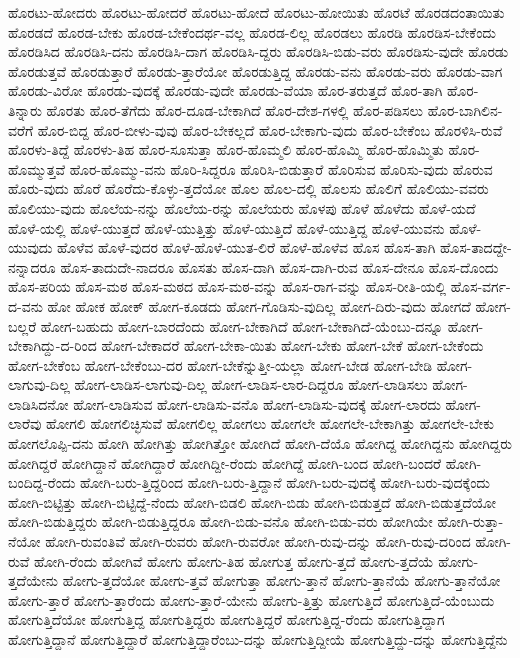 {ಹೊರಟು-ಹೋದರು
ಹೊರಟು-ಹೋದರೆ
ಹೊರಟು-ಹೋದೆ
ಹೊರಟು-ಹೋಯಿತು
ಹೊರಟೆ
ಹೊರಡದಂತಾಯಿತು
ಹೊರಡದೆ
ಹೊರಡ-ಬೇಕು
ಹೊರಡ-ಬೇಕೆಂದರ್ಥ-ವಲ್ಲ
ಹೊರಡ-ಲಿಲ್ಲ
ಹೊರಡಲು
ಹೊರಡಿ
ಹೊರಡಿಸ-ಬೇಕೆಂದು
ಹೊರಡಿಸಿದ
ಹೊರಡಿಸಿ-ದನು
ಹೊರಡಿಸಿ-ದಾಗ
ಹೊರಡಿಸಿ-ದ್ದರು
ಹೊರಡಿಸಿ-ಬಿಡು-ವರು
ಹೊರಡಿಸು-ವುದೇ
ಹೊರಡು
ಹೊರಡುತ್ತವೆ
ಹೊರಡುತ್ತಾರೆ
ಹೊರಡು-ತ್ತಾರೆಯೋ
ಹೊರಡುತ್ತಿದ್ದ
ಹೊರಡು-ವನು
ಹೊರಡು-ವರು
ಹೊರಡು-ವಾಗ
ಹೊರಡು-ವಿರೋ
ಹೊರಡು-ವುದಕ್ಕೆ
ಹೊರಡು-ವುದೇ
ಹೊರಡು-ವೆಯಾ
ಹೊರ-ತರುತ್ತದೆ
ಹೊರ-ತಾಗಿ
ಹೊರ-ತಿನ್ನಾರು
ಹೊರತು
ಹೊರ-ತೆಗೆದು
ಹೊರ-ದೂಡ-ಬೇಕಾಗಿದೆ
ಹೊರ-ದೇಶ-ಗಳಲ್ಲಿ
ಹೊರ-ಪಡಿಸಲು
ಹೊರ-ಬಾಗಿಲಿನ-ವರೆಗೆ
ಹೊರ-ಬಿದ್ದ
ಹೊರ-ಬೀಳು-ವುವು
ಹೊರ-ಬೇಕಲ್ಲದೆ
ಹೊರ-ಬೇಕಾಗು-ವುದು
ಹೊರ-ಬೇಕೆಂಬ
ಹೊರಳಿಸಿ-ರುವೆ
ಹೊರಳು-ತಿದ್ದೆ
ಹೊರಳು-ತಿಹ
ಹೊರ-ಸೂಸುತ್ತಾ
ಹೊರ-ಹೊಮ್ಮಲಿ
ಹೊರ-ಹೊಮ್ಮಿ
ಹೊರ-ಹೊಮ್ಮಿತು
ಹೊರ-ಹೊಮ್ಮುತ್ತವೆ
ಹೊರ-ಹೊಮ್ಮು-ವನು
ಹೊರಿ-ಸಿದ್ದರೂ
ಹೊರಿಸಿ-ಬಿಡುತ್ತಾರೆ
ಹೊರಿಸುವ
ಹೊರಿಸು-ವುದು
ಹೊರುವ
ಹೊರು-ವುದು
ಹೊರೆ
ಹೊರೆದು-ಕೊಳ್ಳು-ತ್ತದೆಯೋ
ಹೊಲ
ಹೊಲ-ದಲ್ಲಿ
ಹೊಲಸು
ಹೊಲಿಗೆ
ಹೊಲಿಯು-ವವರು
ಹೊಲಿಯು-ವುದು
ಹೊಲೆಯ-ನನ್ನು
ಹೊಲೆಯ-ರನ್ನು
ಹೊಲೆಯರು
ಹೊಳಪು
ಹೊಳೆ
ಹೊಳೆದು
ಹೊಳೆ-ಯದೆ
ಹೊಳೆ-ಯಲ್ಲಿ
ಹೊಳೆ-ಯುತ್ತದೆ
ಹೊಳೆ-ಯುತ್ತಿತ್ತು
ಹೊಳೆ-ಯುತ್ತಿದೆ
ಹೊಳೆ-ಯುತ್ತಿದ್ದ
ಹೊಳೆ-ಯುವನು
ಹೊಳೆ-ಯುವುದು
ಹೊಳೆವ
ಹೊಳೆ-ವುದರ
ಹೊಳೆ-ಹೊಳೆ-ಯುತ-ಲಿರೆ
ಹೊಳೆ-ಹೊಳೆವ
ಹೊಸ
ಹೊಸ-ತಾಗಿ
ಹೊಸ-ತಾದದ್ದೇ-ನನ್ನಾದರೂ
ಹೊಸ-ತಾದುದೇ-ನಾದರೂ
ಹೊಸತು
ಹೊಸ-ದಾಗಿ
ಹೊಸ-ದಾಗಿ-ರುವ
ಹೊಸ-ದೇನೂ
ಹೊಸ-ದೊಂದು
ಹೊಸ-ಪರಿಯ
ಹೊಸ-ಮಠ
ಹೊಸ-ಮಠದ
ಹೊಸ-ಮಠ-ವನ್ನು
ಹೊಸ-ರಾಗ-ವನ್ನು
ಹೊಸ-ರೀತಿ-ಯಲ್ಲಿ
ಹೊಸ-ವರ್ಗ-ದ-ವನು
ಹೋ
ಹೋಕ
ಹೋಕ್
ಹೋಗ-ಕೂಡದು
ಹೋಗ-ಗೊಡಿಸು-ವುದಿಲ್ಲ
ಹೋಗ-ದಿರು-ವುದು
ಹೋಗದೆ
ಹೋಗ-ಬಲ್ಲರೆ
ಹೋಗ-ಬಹುದು
ಹೋಗ-ಬಾರದೆಂದು
ಹೋಗ-ಬೇಕಾಗಿದೆ
ಹೋಗ-ಬೇಕಾಗಿದೆ-ಯೆಂಬು-ದನ್ನೂ
ಹೋಗ-ಬೇಕಾಗಿದ್ದು-ದ-ರಿಂದ
ಹೋಗ-ಬೇಕಾದರೆ
ಹೋಗ-ಬೇಕಾ-ಯಿತು
ಹೋಗ-ಬೇಕು
ಹೋಗ-ಬೇಕೆ
ಹೋಗ-ಬೇಕೆಂದು
ಹೋಗ-ಬೇಕೆಂಬ
ಹೋಗ-ಬೇಕೆಂಬು-ದರ
ಹೋಗ-ಬೇಕೆನ್ನುತ್ತೀ-ಯಲ್ಲಾ
ಹೋಗ-ಬೇಡ
ಹೋಗ-ಬೇಡಿ
ಹೋಗ-ಲಾಗುವು-ದಿಲ್ಲ
ಹೋಗ-ಲಾಡಿಸ-ಲಾಗುವು-ದಿಲ್ಲ
ಹೋಗ-ಲಾಡಿಸ-ಲಾರ-ದಿದ್ದರೂ
ಹೋಗ-ಲಾಡಿಸಲು
ಹೋಗ-ಲಾಡಿಸಿದನೋ
ಹೋಗ-ಲಾಡಿಸುವ
ಹೋಗ-ಲಾಡಿಸು-ವನೊ
ಹೋಗ-ಲಾಡಿಸು-ವುದಕ್ಕೆ
ಹೋಗ-ಲಾರದು
ಹೋಗ-ಲಾರೆವು
ಹೋಗಲಿ
ಹೋಗಲಿಚ್ಛಿಸುವೆ
ಹೋಗಲಿಲ್ಲ
ಹೋಗಲು
ಹೋಗಲೇ
ಹೋಗಲೇ-ಬೇಕಾಗಿತ್ತು
ಹೋಗಲೇ-ಬೇಕು
ಹೋಗಲೊಪ್ಪಿ-ದನು
ಹೋಗಿ
ಹೋಗಿತ್ತು
ಹೋಗಿತ್ತೋ
ಹೋಗಿದೆ
ಹೋಗಿ-ದೆಯೊ
ಹೋಗಿದ್ದ
ಹೋಗಿದ್ದನು
ಹೋಗಿದ್ದರು
ಹೋಗಿದ್ದರೆ
ಹೋಗಿದ್ದಾನೆ
ಹೋಗಿದ್ದಾರೆ
ಹೋಗಿದ್ದೀ-ರೆಂದು
ಹೋಗಿದ್ದೆ
ಹೋಗಿ-ಬಂದ
ಹೋಗಿ-ಬಂದರೆ
ಹೋಗಿ-ಬಂದಿದ್ದ-ರೆಂದು
ಹೋಗಿ-ಬರು-ತ್ತಿದ್ದರಿಂದ
ಹೋಗಿ-ಬರು-ತ್ತಿದ್ದಾನೆ
ಹೋಗಿ-ಬರು-ವುದಕ್ಕೆ
ಹೋಗಿ-ಬರು-ವುದಕ್ಕೆಂದು
ಹೋಗಿ-ಬಿಟ್ಟಿತ್ತು
ಹೋಗಿ-ಬಿಟ್ಟಿದ್ದೆ-ನೆಂದು
ಹೋಗಿ-ಬಿಡಲಿ
ಹೋಗಿ-ಬಿಡು
ಹೋಗಿ-ಬಿಡುತ್ತದೆ
ಹೋಗಿ-ಬಿಡುತ್ತದೆಯೋ
ಹೋಗಿ-ಬಿಡುತ್ತಿದ್ದರು
ಹೋಗಿ-ಬಿಡುತ್ತಿದ್ದರೂ
ಹೋಗಿ-ಬಿಡು-ವನೊ
ಹೋಗಿ-ಬಿಡು-ವರು
ಹೋಗಿಯೇ
ಹೋಗಿ-ರುತ್ತಾ-ನೆಯೋ
ಹೋಗಿ-ರುವಂತಿವೆ
ಹೋಗಿ-ರುವರು
ಹೋಗಿ-ರುವರೋ
ಹೋಗಿ-ರುವು-ದನ್ನು
ಹೋಗಿ-ರುವು-ದರಿಂದ
ಹೋಗಿ-ರುವೆ
ಹೋಗಿ-ರೆಂದು
ಹೋಗಿವೆ
ಹೋಗು
ಹೋಗು-ತಿಹ
ಹೋಗುತ್ತ
ಹೋಗು-ತ್ತದೆ
ಹೋಗು-ತ್ತದೆಯೆ
ಹೋಗು-ತ್ತದೆಯೇನು
ಹೋಗು-ತ್ತದೆಯೋ
ಹೋಗು-ತ್ತವೆ
ಹೋಗುತ್ತಾ
ಹೋಗು-ತ್ತಾನೆ
ಹೋಗು-ತ್ತಾನೆಯೆ
ಹೋಗು-ತ್ತಾನೆಯೋ
ಹೋಗು-ತ್ತಾರೆ
ಹೋಗು-ತ್ತಾರೆಂದು
ಹೋಗು-ತ್ತಾರೆ-ಯೇನು
ಹೋಗು-ತ್ತಿತ್ತು
ಹೋಗುತ್ತಿದೆ
ಹೋಗುತ್ತಿದೆ-ಯೆಂಬುದು
ಹೋಗುತ್ತಿದೆಯೋ
ಹೋಗುತ್ತಿದ್ದ
ಹೋಗುತ್ತಿದ್ದರು
ಹೋಗುತ್ತಿದ್ದರೆ
ಹೋಗುತ್ತಿದ್ದ-ರೆಂದು
ಹೋಗುತ್ತಿದ್ದಾಗ
ಹೋಗುತ್ತಿದ್ದಾನೆ
ಹೋಗುತ್ತಿದ್ದಾರೆ
ಹೋಗುತ್ತಿದ್ದಾರೆಂಬು-ದನ್ನು
ಹೋಗುತ್ತಿದ್ದೀಯೆ
ಹೋಗುತ್ತಿದ್ದು-ದನ್ನು
ಹೋಗುತ್ತಿದ್ದೆನು
}
